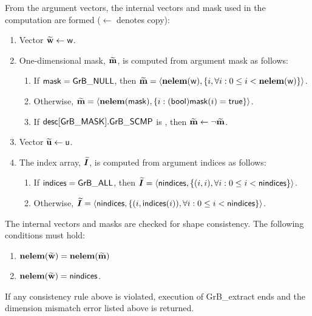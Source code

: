 From the argument vectors, the internal vectors and mask used in 
the computation are formed ($\leftarrow$ denotes copy):
\begin{enumerate}
	\item Vector ${\bf \widetilde{w}} \leftarrow {\sf w}$.

	\item One-dimensional mask, ${\bf \widetilde{m}}$, is computed from 
    argument {\sf mask} as follows:
	\begin{enumerate}
		\item	If ${\sf mask} = {\sf GrB\_NULL}$, then ${\bf \widetilde{m}} = 
        \langle \bold{nelem}({\sf w}), \{i, \forall i : 0 \leq i < 
        \bold{nelem}({\sf w}) \} \rangle$.

		\item	Otherwise, ${\bf \widetilde{m}} = 
        \langle \bold{nelem}({\sf mask}), \{i : ({\sf bool}){\sf mask}(i) = 
        {\sf true}\} \rangle$.

		\item	If ${\sf desc[GrB\_MASK].GrB\_SCMP}$ is \true, then ${\bf \widetilde{m}} \leftarrow \neg {\bf \widetilde{m}}$.
	\end{enumerate}

	\item Vector ${\bf \widetilde{u}} \leftarrow {\sf u}$.
    
    \item The index array, $\bm{\widetilde{I}}$, is computed from 
    argument {\sf indices} as follows:
	\begin{enumerate}
		\item	If ${\sf indices} = {\sf GrB\_ALL}$, then $\bm{\widetilde{I}} = 
        \langle {\sf nindices}, \{(i, i), \forall i : 0 \leq i < 
        {\sf nindices} \} \rangle$.

		\item	Otherwise, $\bm{\widetilde{I}} = 
        \langle {\sf nindices}, \{(i, {\sf indices}(i)), \forall i : 0 \leq i < 
        {\sf nindices} \} \rangle$.
    \end{enumerate}
\end{enumerate}

The internal vectors and masks are checked for shape consistency. The following 
conditions must hold:
\begin{enumerate}
	\item $\bold{nelem}({\bf \widetilde{w}}) = \bold{nelem}({\bf \widetilde{m}})$
    \item $\bold{nelem}({\bf \widetilde{w}}) = {\sf nindices}$.
\end{enumerate}
If any consistency rule above is violated, execution of {\sf GrB\_extract} ends and 
the dimension mismatch error listed above is returned.

